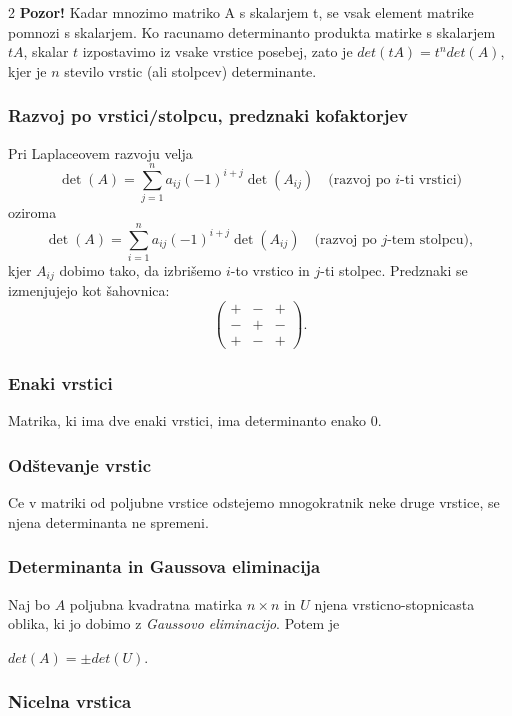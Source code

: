 \documentclass{article}
\begin{document}
\begin{multicols}{2}
	\textbf{Pozor!} Kadar mnozimo matriko A s skalarjem t, se vsak element matrike pomnozi s skalarjem.
	Ko racunamo determinanto produkta matirke s skalarjem $tA$, skalar $t$ izpostavimo iz vsake vrstice posebej,
	zato je $det(tA) = t^{n}det(A)$, kjer je $n$ stevilo vrstic (ali stolpcev) determinante.

	\subsubsection{Razvoj po vrstici/stolpcu, predznaki kofaktorjev}

	Pri Laplaceovem razvoju velja
	\[
		\det(A)=\sum_{j=1}^n a_{ij}(-1)^{i+j}\det(A_{ij})
		\quad\text{(razvoj po $i$-ti vrstici)}
	\]
	oziroma
	\[
		\det(A)=\sum_{i=1}^n a_{ij}(-1)^{i+j}\det(A_{ij})
		\quad\text{(razvoj po $j$-tem stolpcu)},
	\]
	kjer $A_{ij}$ dobimo tako, da izbri\v{s}emo $i$-to vrstico in $j$-ti stolpec.
	Predznaki se izmenjujejo kot \v{s}ahovnica:
	\[
		\begin{pmatrix}
			+ & - & + \\
			- & + & - \\
			+ & - & +
		\end{pmatrix}.
	\]

	\subsubsection{Enaki vrstici}

	Matrika, ki ima dve enaki vrstici, ima determinanto enako 0.

	\subsubsection{Odštevanje vrstic}

	Ce v matriki od poljubne vrstice odstejemo mnogokratnik neke druge vrstice,
	se njena determinanta ne spremeni.

	\subsubsection{Determinanta in Gaussova eliminacija}

	Naj bo $A$ poljubna kvadratna matirka $n \times n$ in $U$ njena vrsticno-stopnicasta
	oblika, ki jo dobimo z \textit{Gaussovo eliminacijo}. Potem je
	\begin{center}
		$det(A) = \pm det(U)$.
	\end{center}

	\subsubsection{Nicelna vrstica}


\end{multicols}
\end{document}

